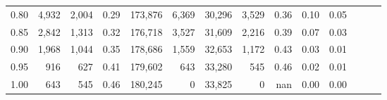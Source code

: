 \begin{tabular}{rrrrrrrrrrrrrr}
0.80 &   4,932 &  2,004 &  0.29 &  173,876 &    6,369 &  30,296 &   3,529 &  0.36 &  0.10 &      0.05 \\
0.85 &   2,842 &  1,313 &  0.32 &  176,718 &    3,527 &  31,609 &   2,216 &  0.39 &  0.07 &      0.03 \\
0.90 &   1,968 &  1,044 &  0.35 &  178,686 &    1,559 &  32,653 &   1,172 &  0.43 &  0.03 &      0.01 \\
0.95 &     916 &    627 &  0.41 &  179,602 &      643 &  33,280 &     545 &  0.46 &  0.02 &      0.01 \\
1.00 &     643 &    545 &  0.46 &  180,245 &        0 &  33,825 &       0 &   nan &  0.00 &      0.00 \\
\bottomrule
\end{tabular}
